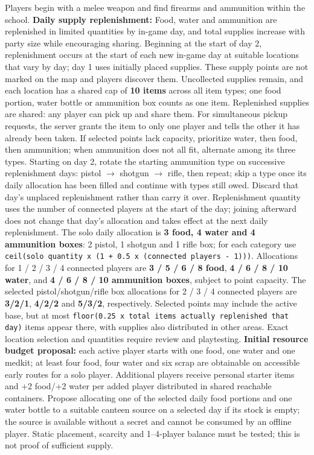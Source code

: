 Players begin with a melee weapon and find firearms and ammunition within the school. \textbf{Daily supply replenishment:} Food, water and ammunition are replenished in limited quantities by in-game day, and total supplies increase with party size while encouraging sharing. Beginning at the start of day 2, replenishment occurs at the start of each new in-game day at suitable locations that vary by day; day 1 uses initially placed supplies. These supply points are not marked on the map and players discover them. Uncollected supplies remain, and each location has a shared cap of \textbf{10 items} across all item types; one food portion, water bottle or ammunition box counts as one item. Replenished supplies are shared: any player can pick up and share them. For simultaneous pickup requests, the server grants the item to only one player and tells the other it has already been taken. If selected points lack capacity, prioritize water, then food, then ammunition; when ammunition does not all fit, alternate among its three types. Starting on day 2, rotate the starting ammunition type on successive replenishment days: pistol  $\rightarrow$  shotgun  $\rightarrow$  rifle, then repeat; skip a type once its daily allocation has been filled and continue with types still owed. Discard that day's unplaced replenishment rather than carry it over. Replenishment quantity uses the number of connected players at the start of the day; joining afterward does not change that day's allocation and takes effect at the next daily replenishment. The solo daily allocation is \textbf{3 food, 4 water and 4 ammunition boxes}: 2 pistol, 1 shotgun and 1 rifle box; for each category use \texttt{ceil(solo quantity  x  (1 + 0.5  x  (connected players - 1)))}. Allocations for 1 / 2 / 3 / 4 connected players are \textbf{3 / 5 / 6 / 8 food}, \textbf{4 / 6 / 8 / 10 water}, and \textbf{4 / 6 / 8 / 10 ammunition boxes}, subject to point capacity. The selected pistol/shotgun/rifle box allocations for 2 / 3 / 4 connected players are \textbf{3/2/1}, \textbf{4/2/2} and \textbf{5/3/2}, respectively. Selected points may include the active base, but at most \texttt{floor(0.25  x  total items actually replenished that day)} items appear there, with supplies also distributed in other areas. Exact location selection and quantities require review and playtesting. \textbf{Initial resource budget proposal:} each active player starts with one food, one water and one medkit; at least four food, four water and six scrap are obtainable on accessible early routes for a solo player. Additional players receive personal starter items and +2 food/+2 water per added player distributed in shared reachable containers. Propose allocating one of the selected daily food portions and one water bottle to a suitable canteen source on a selected day if its stock is empty; the source is available without a secret and cannot be consumed by an offline player. Static placement, scarcity and 1--4-player balance must be tested; this is not proof of sufficient supply.

